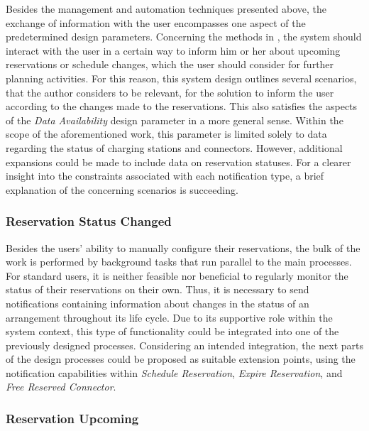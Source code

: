 Besides the management and automation techniques presented above, the exchange of information with the user encompasses one aspect of the predetermined design parameters.
Concerning the methods in \cite{zarkeshev_charging_2018}, the system should interact with the user in a certain way to inform him or her about upcoming reservations or schedule changes, which the user should consider for further planning activities.
For this reason, this system design outlines several scenarios, that the author considers to be relevant, for the solution to inform the user according to the changes made to the reservations. 
This also satisfies the aspects of the \textit{Data Availability} design parameter in a more general sense. Within the scope of the aforementioned work, this parameter is limited solely to data regarding the status of charging stations and connectors. However, additional expansions could be made to include data on reservation statuses.
For a clearer insight into the constraints associated with each notification type, a brief explanation of the concerning scenarios is succeeding. 

\subsubsection{Reservation Status Changed}
\label{ch:Design:sec:Reservation System:ssec:Notification Capabilities:sssec:Reservation Status Changed}

Besides the users' ability to manually configure their reservations, the bulk of the work is performed by background tasks that run parallel to the main processes.
For standard users, it is neither feasible nor beneficial to regularly monitor the status of their reservations on their own. Thus, it is necessary to send notifications containing information about changes in the status of an arrangement throughout its life cycle.
Due to its supportive role within the system context, this type of functionality could be integrated into one of the previously designed processes. 
Considering an intended integration, the next parts of the design processes could be proposed as suitable extension points, using the notification capabilities within \textit{Schedule Reservation}, \textit{Expire Reservation}, and \textit{Free Reserved Connector}.

\subsubsection{Reservation Upcoming}
\label{ch:Design:sec:Reservation System:ssec:Notification Capabilities:sssec:Reservation Upcoming}

